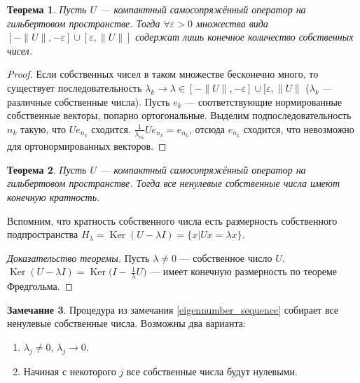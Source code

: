\documentclass[11pt,openany,a4paper]{scrartcl}
\theoremstyle{plain}
\newtheorem{theorem}{Теорема}[subsection]
\theoremstyle{definition}
\newtheorem{remark}[theorem]{Замечание}
\DeclareMathOperator{\Ker}{Ker}
\begin{document}
\begin{theorem}
    Пусть $U$ — компактный самосопряжённый оператор на гильбертовом пространстве. Тогда
    $\forall \varepsilon > 0$ множества вида $[-\|U\|, -\varepsilon] \cup [\varepsilon, \|U\|]$
    содержат лишь конечное количество собственных чисел.
\end{theorem}
\begin{proof}
    Если собственных чисел в таком множестве бесконечно много, то существует последовательность
    $\lambda_k \to \lambda \in [-\|U\|, - \varepsilon] \cup [\varepsilon, \|U\|$ ($\lambda_k$ —
    различные собственные числа). Пусть $e_k$ — соответствующие нормированные собственные векторы, 
    попарно ортогональные. Выделим подпоследовательность $n_k$ такую, что $Ue_{n_k}$ сходится.
    $\frac{1}{\lambda_{n_k}}Ue_{n_k} = e_{n_k}$, отсюда $e_{n_k}$ сходится, что невозможно для
    ортонормированных векторов.
\end{proof}

\begin{theorem}
    Пусть $U$ — компактный самосопряжённый оператор на гильбертовом пространстве. Тогда
    все ненулевые собственные числа имеют конечную кратность.
\end{theorem}

Вспомним, что кратность собственного числа есть размерность собственного подпространства
$H_\lambda = \Ker (U - \lambda I) = \{x | Ux = \lambda x\}$.

\begin{proof}[Доказательство теоремы]
    Пусть $\lambda \neq 0$ — собственное число $U$.
    $\Ker(U-\lambda I) = \Ker \bigg(I -~\frac{1}{\lambda}U\bigg)$ — имеет конечную размерность
    по теореме Фредгольма.
\end{proof}

\begin{remark}
    Процедура из замечания \ref{eigennumber_sequence} собирает все ненулевые собственные числа.
    Возможны два варианта:
    \begin{enumerate}
        \item $\lambda_j \neq 0$, $\lambda_j \to 0$.
        \item Начиная с некоторого $j$ все собственные числа будут нулевыми.
    \end{enumerate}
\end{remark}
\end{document}
